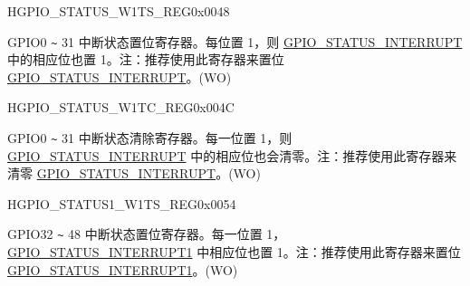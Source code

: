 \begin{register}{H}{GPIO\_STATUS\_W1TS\_REG}{0x{}0048}\label{regdesc:GPIOSTATUSW1TSREG}
%
\regnewline%
\begin{regdesc}\begin{reglist}
\label{fielddesc:GPIOSTATUSW1TS}\item [GPIO\_STATUS\_W1TS] GPIO0 \verb+~+ 31 中断状态置位寄存器。每位置 1，则  \hyperref[fielddesc:GPIOSTATUSINTERRUPT]{GPIO\_STATUS\_INTERRUPT} 中的相应位也置 1。注：推荐使用此寄存器来置位 \hyperref[fielddesc:GPIOSTATUSINTERRUPT]{GPIO\_STATUS\_INTERRUPT}。(WO)
\end{reglist}\end{regdesc}
\end{register}


\begin{register}{H}{GPIO\_STATUS\_W1TC\_REG}{0x{}004C}\label{regdesc:GPIOSTATUSW1TCREG}
%
\regnewline%
\begin{regdesc}\begin{reglist}
\label{fielddesc:GPIOSTATUSW1TC}\item [GPIO\_STATUS\_W1TC] GPIO0 \verb+~+ 31 中断状态清除寄存器。每一位置 1，则  \hyperref[fielddesc:GPIOSTATUSINTERRUPT]{GPIO\_STATUS\_INTERRUPT} 中的相应位也会清零。注：推荐使用此寄存器来清零 \hyperref[fielddesc:GPIOSTATUSINTERRUPT]{GPIO\_STATUS\_INTERRUPT}。(WO)
\end{reglist}\end{regdesc}
\end{register}


\begin{register}{H}{GPIO\_STATUS1\_W1TS\_REG}{0x{}0054}\label{regdesc:GPIOSTATUS1W1TSREG}
%
%
\regnewline%
\begin{regdesc}\begin{reglist}
\label{fielddesc:GPIOSTATUS1W1TS}\item [GPIO\_STATUS1\_W1TS] GPIO32 \verb+~+ 48 中断状态置位寄存器。每一位置 1， \hyperref[fielddesc:GPIOSTATUS1INTERRUPT]{GPIO\_STATUS\_INTERRUPT1} 中相应位也置 1。注：推荐使用此寄存器来置位 \hyperref[fielddesc:GPIOSTATUS1INTERRUPT]{GPIO\_STATUS\_INTERRUPT1}。(WO)
\end{reglist}\end{regdesc}
\end{register}


